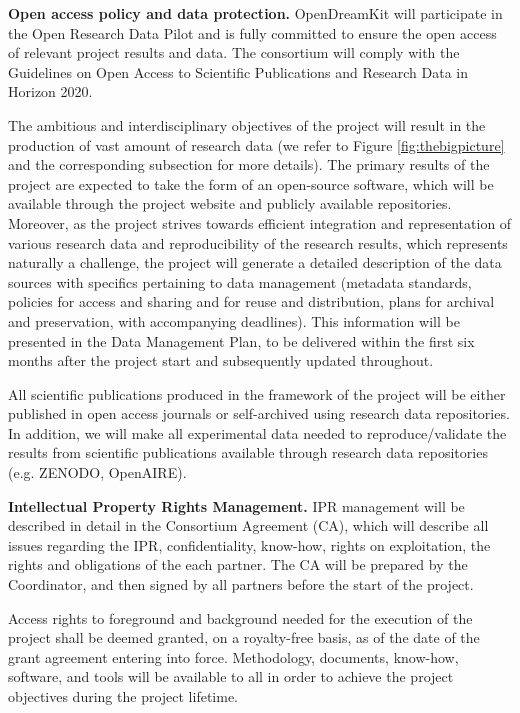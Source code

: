 {\bf Open access policy and data protection.} OpenDreamKit will participate in the Open Research Data Pilot and is fully committed to ensure the open access of relevant project results and data. The consortium will comply with the Guidelines on Open Access to Scientific Publications and Research Data in Horizon 2020. 

The ambitious and interdisciplinary objectives of the project will result in the production of vast amount of research data (we refer to Figure \ref{fig:thebigpicture} and the corresponding subsection for more details). The primary results of the project are expected to take the form of an open-source software, which will be available through the project website and publicly available repositories. Moreover, as the project strives towards efficient integration and representation of various research data and reproducibility of the research results, which represents naturally a challenge, the project will generate a detailed description of the data sources with specifics pertaining to data management (metadata standards, policies for access and sharing and for reuse and distribution, plans for archival and preservation, with accompanying deadlines). This information will be presented in the Data Management Plan, to be delivered within the first six months after the project start and subsequently updated throughout. 

All scientific publications produced in the framework of the project will be either published in open access journals or self-archived using research data repositories. In addition, we will make all experimental data needed to reproduce/validate the results from scientific publications available through research data repositories (e.g. ZENODO, OpenAIRE). 

{\bf Intellectual Property Rights Management.} IPR management will be described in detail in the Consortium Agreement (CA), which will describe all issues regarding the IPR, confidentiality, know-how, rights on exploitation, the rights and obligations of the each partner. The CA will be prepared by the Coordinator, and then signed by all partners before the start of the project. 

Access rights to foreground and background needed for the execution of the project shall be deemed granted, on a royalty-free basis, as of the date of the grant agreement entering into force. Methodology, documents, know-how, software, and tools will be available to all in order to achieve the project objectives during the project lifetime. 


